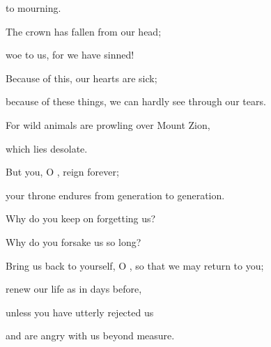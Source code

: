 {to mourning.
\par }{\Q {}The crown
has fallen
from our head;
\par }{\Q woe
to us,
for
we have sinned!
\par }{\Q {}Because
of this,
our hearts
are sick;
\par }{\Q because of these
things, we can hardly see
through our tears.
\par }{\Q {}For wild animals
are prowling over
Mount
Zion,
\par }{\Q which lies desolate.
\par }{\Q {}But you,
O
{}, reign forever;
\par }{\Q your throne
endures
from generation
to generation.
\par }{\Q {}Why
do you keep on forgetting us?
\par }{\Q Why do
you forsake
us so long?
\par }{\Q {}Bring
us
back
to yourself, O
{}, so that we may return
to you;
\par }{\Q renew
our life as in days
before,
\par }{\Q {}unless
you have utterly
rejected
us

\par }{\PP and are angry
with
us beyond
measure.

\par }